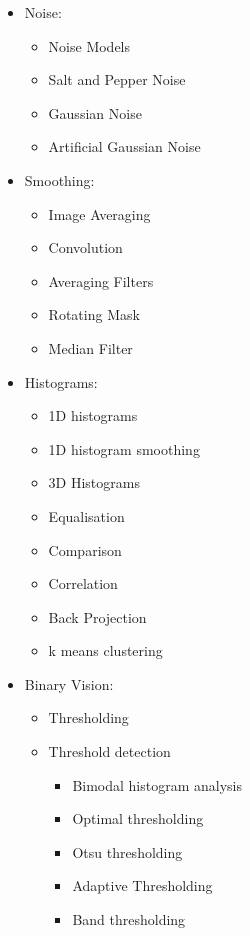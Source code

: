 \documentclass[a4paper,11pt]{article}
\begin{document}
\begin{itemize}
    \item Noise:
        \begin{itemize}
            \item Noise Models 
            \item Salt and Pepper Noise
            \item Gaussian Noise
            \item Artificial Gaussian Noise
        \end{itemize}
    \item Smoothing:
        \begin{itemize}
            \item Image Averaging
            \item Convolution
            \item Averaging Filters 
            \item Rotating Mask
            \item Median Filter
        \end{itemize}
    \item Histograms:
        \begin{itemize}
            \item 1D histograms
            \item 1D histogram smoothing
            \item 3D Histograms
            \item Equalisation
            \item Comparison
            \item Correlation
            \item Back Projection
            \item k means clustering
        \end{itemize}
    \item Binary Vision:
        \begin{itemize}
            \item Thresholding
            \item Threshold detection 
                \begin{itemize}
                    \item Bimodal histogram analysis
                    \item Optimal thresholding
                    \item Otsu thresholding
                    \item Adaptive Thresholding
                    \item Band thresholding

\end{itemize}
\end{itemize}
\end{itemize}
\end{document}
